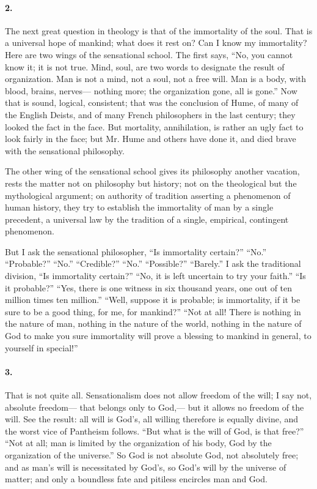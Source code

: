 \documentclass[12pt]{article}
\begin{document}
\paragraph{2.} The next great question in theology is that of the immortality of the soul. That is a universal hope of mankind; what does it rest on? Can I know my immortality? Here are two wings of the sensational school. The first says, ``No, you cannot know it; it is not true. Mind, soul, are two words to designate the result of organization. Man is not a mind, not a soul, not a free will. Man is a body, with blood, brains, nerves--- nothing more; the organization gone, all is gone.'' Now that is sound, logical, consistent; that was the conclusion of Hume, of many of the English Deists, and of many French philosophers in the last century; they looked the fact in the face. But mortality, annihilation, is rather an ugly fact to look fairly in the face; but Mr. Hume and others have done it, and died brave with the sensational philosophy. 


The other wing of the sensational school gives its philosophy another vacation, rests the matter not on philosophy but history; not on the theological but the mythological argument; on authority of tradition asserting a phenomenon of human history, they try to establish the immortality of man by a single precedent, a universal law by the tradition of a single, empirical, contingent phenomenon. 

But I ask the sensational philosopher, ``Is immortality certain?'' ``No.'' ``Probable?'' ``No.'' ``Credible?'' ``No.'' ``Possible?'' ``Barely.'' I ask the traditional division, ``Is immortality certain?'' ``No, it is left uncertain to try your faith.'' ``Is it probable?'' ``Yes, there is one witness in six thousand years, one out of ten million times ten million.'' ``Well, suppose it is probable; is immortality, if it be sure to be a good thing, for me, for mankind?'' ``Not at all! There is nothing in the nature of man, nothing in the nature of the world, nothing in the nature of God to make you sure immortality will prove a blessing to mankind in general, to yourself in special!'' 

\paragraph{3.} That is not quite all. Sensationalism does not allow freedom of the will; I say not, absolute freedom--- that belongs only to God,--- but it allows no freedom of the will. See the result: all will is God's, all willing therefore is equally divine, and the worst vice of Pantheism follows. ``But what is the will of God, is that free?'' ``Not at all; man is limited by the organization of his body, God by the organization of the universe.'' So God is not absolute God, not absolutely free; and as man's will is necessitated by God's, so God's will by the universe of matter; and only a boundless fate and pitiless encircles man and God. 
\end{document}
